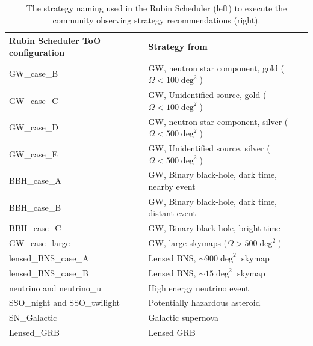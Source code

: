 \begin{table}[]
\centering
\begin{tabular}{|l|l|}
\hline
\textbf{Rubin Scheduler ToO configuration} & \textbf{Strategy from \citet{RubinToO2024}} \\ \hline \hline
GW\_case\_B                         & GW, neutron star component, gold ($\Omega <100\deg^2$)                                             \\ \hline
GW\_case\_C                         & GW, Unidentified source, gold ($\Omega <100\deg^2$)                                   \\ \hline
GW\_case\_D                         & GW, neutron star component, silver ($\Omega <500\deg^2$)                                           \\ \hline
GW\_case\_E                         & GW, Unidentified source, silver ($\Omega <500\deg^2$)                                 \\ \hline
BBH\_case\_A                        & GW, Binary black-hole, dark time, nearby event                                     \\ \hline
BBH\_case\_B                        & GW, Binary black-hole, dark time, distant event                                      \\ \hline
BBH\_case\_C                        & GW, Binary black-hole, bright time                                         \\ \hline
GW\_case\_large                     & GW, large skymaps ($\Omega>500\deg^2$)                                    \\ \hline
lensed\_BNS\_case\_A                & Lensed BNS, $\sim900\deg^2$ skymap                                      \\ \hline
lensed\_BNS\_case\_B                & Lensed BNS, $\sim15\deg^2$ skymap                                       \\ \hline
neutrino and neutrino\_u            & High energy neutrino event                                            \\ \hline
SSO\_night and SSO\_twilight                       & Potentially hazardous asteroid                                           \\ \hline
SN\_Galactic                        & Galactic supernova                                  \\ \hline
Lensed\_GRB                         & Lensed GRB                                          \\ \hline
\end{tabular}
\caption{The strategy naming used in the Rubin Scheduler (left) to execute the community observing strategy recommendations (right).}
\label{table:ToOStrategies_sched}
\end{table}

